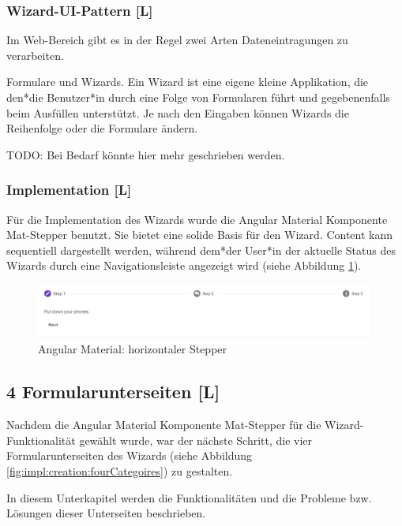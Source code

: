 \subsubsection{Wizard-UI-Pattern [L]}
Im Web-Bereich gibt es in der Regel zwei Arten Dateneintragungen zu verarbeiten.

Formulare und Wizards. Ein Wizard ist eine eigene kleine Applikation, die den*die Benutzer*in durch eine Folge von Formularen führt und gegebenenfalls beim Ausfüllen unterstützt. Je nach den Eingaben können Wizards die Reihenfolge oder die Formulare ändern.

TODO: Bei Bedarf könnte hier mehr geschrieben werden. \cite[Wizards: Definition and Design Recommendations]{WizradsDefinitionAndRecommandation}

\subsubsection{Implementation [L]}
Für die Implementation des Wizards wurde die Angular Material Komponente Mat-Stepper benutzt. Sie bietet eine solide Basis für den Wizard. Content kann sequentiell dargestellt werden, während dem*der User*in der aktuelle Status des Wizards durch eine Navigationsleiste angezeigt wird (siehe Abbildung \ref{fig:impl:creation:mathorziontalstepper}). \cite{amStepper}

\begin{figure}
    \centering
    \includegraphics[scale=0.5]{pics/mathorziontalstepper.png}
    \caption{Angular Material: horizontaler Stepper \cite{amStepper}}
    \label{fig:impl:creation:mathorziontalstepper}
\end{figure}

\subsection{4 Formularunterseiten [L]}
Nachdem die Angular Material Komponente Mat-Stepper für die Wizard-Funktionalität gewählt wurde, war der nächste Schritt, die vier Formularunterseiten des Wizards (siehe Abbildung \ref{fig:impl:creation:fourCategoires}) zu gestalten.

In diesem Unterkapitel werden die Funktionalitäten und die Probleme bzw. Lösungen dieser Unterseiten beschrieben. 


